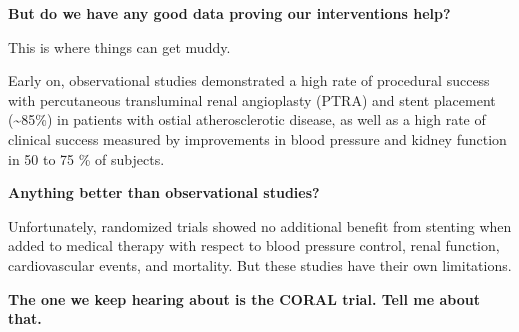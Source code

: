 \documentclass[
]{book}
\begin{document}
\textbf{But do we have any good data proving our interventions help?}

This is where things can get muddy.

Early on, observational studies demonstrated a high rate of procedural
success with percutaneous transluminal renal angioplasty (PTRA) and
stent placement (\textasciitilde85\%) in patients with ostial atherosclerotic disease,
as well as a high rate of clinical success measured by improvements in
blood pressure and kidney function in 50 to 75 \% of subjects.

\textbf{Anything better than observational studies?}

Unfortunately, randomized trials showed no additional benefit from
stenting when added to medical therapy with respect to blood pressure
control, renal function, cardiovascular events, and mortality. But these
studies have their own limitations.

\textbf{The one we keep hearing about is the CORAL trial. Tell me about
that.}
\end{document}
